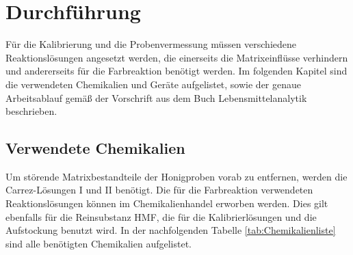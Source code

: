 \chapter{Durchführung}

\label{chap:Durchführung}

Für die Kalibrierung und die Probenvermessung müssen verschiedene Reaktionslösungen angesetzt werden, die einerseits die Matrixeinflüsse verhindern und andererseits für die Farbreaktion benötigt werden. Im folgenden Kapitel sind die verwendeten Chemikalien und Geräte aufgelistet, sowie der genaue Arbeitsablauf gemäß der Vorschrift aus dem Buch Lebensmittelanalytik~\cite{Lebensmittelanalytik} beschrieben.

\section{Verwendete Chemikalien}

Um störende Matrixbestandteile der Honigproben vorab zu entfernen, werden die Carrez-Lösungen I und II benötigt. Die für die Farbreaktion verwendeten Reaktionslösungen können im Chemikalienhandel erworben werden. Dies gilt ebenfalls für die Reinsubstanz HMF, die für die Kalibrierlösungen und die Aufstockung benutzt wird. In der nachfolgenden Tabelle \ref{tab:Chemikalienliste} sind alle benötigten Chemikalien aufgelistet.

